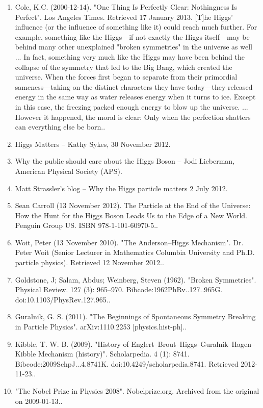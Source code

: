 \begin{enumerate}
    \item Cole, K.C. (2000-12-14). "One Thing Is Perfectly Clear: Nothingness Is Perfect". Los Angeles Times. Retrieved 17 January 2013. [T]he Higgs' influence (or the influence of something like it) could reach much further. For example, something like the Higgs—if not exactly the Higgs itself—may be behind many other unexplained "broken symmetries" in the universe as well ... In fact, something very much like the Higgs may have been behind the collapse of the symmetry that led to the Big Bang, which created the universe. When the forces first began to separate from their primordial sameness—taking on the distinct characters they have today—they released energy in the same way as water releases energy when it turns to ice. Except in this case, the freezing packed enough energy to blow up the universe. ... However it happened, the moral is clear: Only when the perfection shatters can everything else be born..
    \item Higgs Matters – Kathy Sykes, 30 November 2012.
    \item Why the public should care about the Higgs Boson – Jodi Lieberman, American Physical Society (APS).
    \item Matt Strassler's blog – Why the Higgs particle matters 2 July 2012.
    \item Sean Carroll (13 November 2012). The Particle at the End of the Universe: How the Hunt for the Higgs Boson Leads Us to the Edge of a New World. Penguin Group US. ISBN 978-1-101-60970-5..
    \item Woit, Peter (13 November 2010). "The Anderson–Higgs Mechanism". Dr. Peter Woit (Senior Lecturer in Mathematics Columbia University and Ph.D. particle physics). Retrieved 12 November 2012..
    \item Goldstone, J; Salam, Abdus; Weinberg, Steven (1962). "Broken Symmetries". Physical Review. 127 (3): 965–970. Bibcode:1962PhRv..127..965G. doi:10.1103/PhysRev.127.965..
    \item Guralnik, G. S. (2011). "The Beginnings of Spontaneous Symmetry Breaking in Particle Physics". arXiv:1110.2253 [physics.hist-ph]..
    \item Kibble, T. W. B. (2009). "History of Englert–Brout–Higgs–Guralnik–Hagen–Kibble Mechanism (history)". Scholarpedia. 4 (1): 8741. Bibcode:2009SchpJ...4.8741K. doi:10.4249/scholarpedia.8741. Retrieved 2012-11-23..
    \item "The Nobel Prize in Physics 2008". Nobelprize.org. Archived from the original on 2009-01-13..

\end{enumerate}
